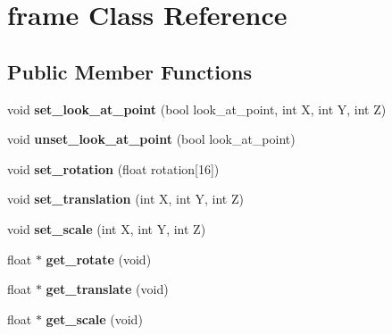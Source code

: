 \hypertarget{classframe}{}\section{frame Class Reference}
\label{classframe}
\subsection*{Public Member Functions}
\begin{DoxyCompactItemize}
\item 
\mbox{\label{classframe_a14c439c71e64179c6ae6d54aee3d7598}} 
void {\bfseries set\+\_\+look\+\_\+at\+\_\+point} (bool look\+\_\+at\+\_\+point, int X, int Y, int Z)
\item 
\mbox{\label{classframe_aeec2715a6e21ba2d2248eba3ec5a2cfb}} 
void {\bfseries unset\+\_\+look\+\_\+at\+\_\+point} (bool look\+\_\+at\+\_\+point)
\item 
\mbox{\label{classframe_a52aa4eb0edf68e5bbf3e9a586d20ab9e}} 
void {\bfseries set\+\_\+rotation} (float rotation\mbox{[}16\mbox{]})
\item 
\mbox{\label{classframe_a0d95498d2e4f983518e9640d65c92443}} 
void {\bfseries set\+\_\+translation} (int X, int Y, int Z)
\item 
\mbox{\label{classframe_aa8ec8d24f72722a5c6f32d549b17bd92}} 
void {\bfseries set\+\_\+scale} (int X, int Y, int Z)
\item 
\mbox{\label{classframe_a6c1fa1eb36bb8ee0c4ce88082c278d90}} 
float $\ast$ {\bfseries get\+\_\+rotate} (void)
\item 
\mbox{\label{classframe_a2438d34d2e8523d8fdbbaefd52d37e3f}} 
float $\ast$ {\bfseries get\+\_\+translate} (void)
\item 
\mbox{\label{classframe_a28904818d025cfe902ed0956b8fe7f9b}} 
float $\ast$ {\bfseries get\+\_\+scale} (void)
\end{DoxyCompactItemize}
